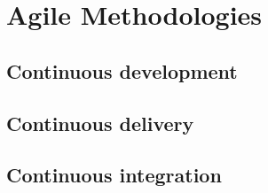 \section{Agile Methodologies}

\subsection{Continuous development}



\subsection{Continuous delivery}



\subsection{Continuous integration}

